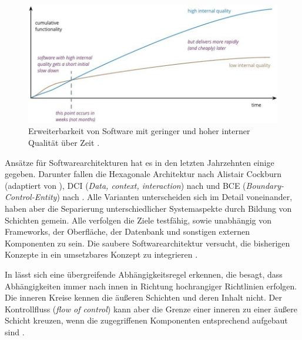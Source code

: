 \begin{figure}
  \centering
  \includegraphics[width=1\textwidth]{res/quality_code.jpg}
   \caption{Erweiterbarkeit von Software mit geringer und hoher interner Qualität über Zeit \citep[][]{fowler2019}.}
   \label{fig:quality_code}
\end{figure}

Ansätze für Softwarearchitekturen hat es in den letzten Jahrzehnten einige gegeben. Darunter fallen die 
Hexagonale Architektur nach Alistair Cockburn (adaptiert von ), 
DCI (\textit{Data, context, interaction}) nach  und 
BCE (\textit{Boundary-Control-Entity}) nach . 
Alle Varianten unterscheiden sich im Detail voneinander, haben aber die Separierung unterschiedlicher Systemaspekte durch Bildung von Schichten gemein. Alle verfolgen die Ziele testfähig, sowie unabhängig von Frameworks,  der Oberfläche, der Datenbank und sonstigen externen Komponenten zu sein. Die saubere Softwarearchitektur versucht, die bisherigen Konzepte in ein umsetzbares Konzept zu integrieren \citep[][202]{martin2018}. 

In  lässt sich eine übergreifende Abhängigkeitsregel erkennen, die besagt, dass Abhängigkeiten immer nach innen in Richtung hochrangiger Richtlinien erfolgen. Die inneren Kreise kennen die äußeren Schichten und deren Inhalt nicht. Der Kontrollfluss (\textit{flow of control}) kann aber die Grenze einer inneren zu einer äußere Schicht kreuzen, wenn die zugegriffenen Komponenten entsprechend aufgebaut sind \citep[vgl.][203]{martin2018}.



